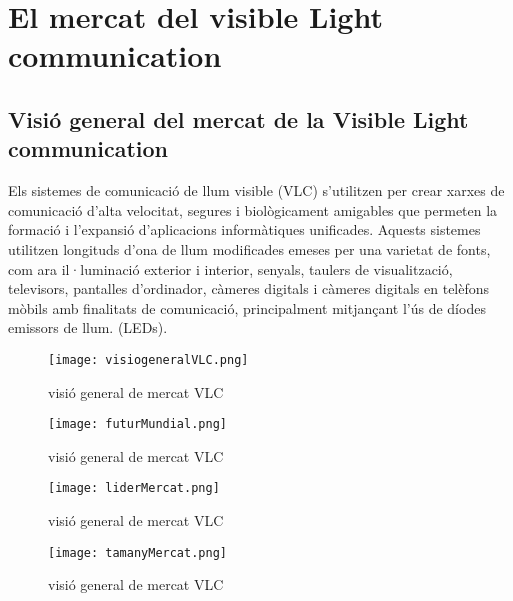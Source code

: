 \section*{El mercat del visible Light communication}

\subsection*{Visió general del mercat de la Visible Light communication}
Els sistemes de comunicació de llum visible (VLC) s'utilitzen per crear xarxes de comunicació d'alta velocitat, segures i biològicament amigables que permeten la formació i l'expansió d'aplicacions informàtiques unificades. Aquests sistemes utilitzen longituds d'ona de llum modificades emeses per una varietat de fonts, com ara il·luminació exterior i interior, senyals, taulers de visualització, televisors, pantalles d'ordinador, càmeres digitals i càmeres digitals en telèfons mòbils amb finalitats de comunicació, principalment mitjançant l'ús de díodes emissors de llum. (LEDs).


\begin{figure}[h!]
    \centering
    \texttt{[image: visiogeneralVLC.png]}
    \caption{visió general de mercat VLC}
    \label{fig:method}
\end{figure}


\begin{figure}[h!]
    \centering
    \texttt{[image: futurMundial.png]}
    \caption{visió general de mercat VLC}
    \label{fig:method}
\end{figure}


\begin{figure}[h!]
    \centering
    \texttt{[image: liderMercat.png]}
    \caption{visió general de mercat VLC}
    \label{fig:method}
\end{figure}


\begin{figure}[h!]
    \centering
    \texttt{[image: tamanyMercat.png]}
    \caption{visió general de mercat VLC}
    \label{fig:method}
\end{figure}
